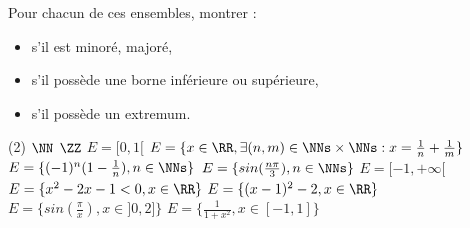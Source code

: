 %
%
	Pour chacun de ces ensembles, montrer :
	\begin{itemize}
		\item s'il est minoré, majoré,
		\item s'il possède une borne inférieure ou supérieure,
		\item  s'il possède un extremum.
	\end{itemize}
	\begin{tasks}(2)
		\task $\NN$
		\task $\ZZ$
		\task $E = [0,1[$
		\task $E = \{ x \in \RR, \exists (n,m) \in \NNs \times \NNs : x=\frac{1}{n} + \frac{1}{m} \}$
		\task $E = \{(-1)^n(1-\frac{1}{n}), n \in \NNs \}$
		\task $E = \{sin(\frac{n \pi}{3}), n \in \NNs \}$
		\task $E = [-1,+\infty[$
		\task $E = \{x^2 - 2x -1 <0, x \in \RR \}$
		\task $E = \{(x-1)^2-2, x \in \RR \}$
	    \task $E = \{sin(\frac{\pi}{x}), x \in ]0,2] \}$
	    \task $E = \{\frac{1}{1+x^2}, x \in [-1,1] \}$
	\end{tasks}
